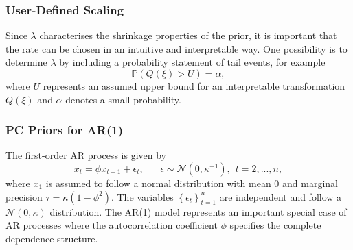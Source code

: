 \documentclass[12pt]{book}
\begin{document}
\subsubsection*{User-Defined Scaling}
Since $\lambda$ characterises the shrinkage properties of the prior, it is important that the rate can be chosen in an intuitive and interpretable way. One possibility is to determine $\lambda$ by including a probability statement of tail events, for example
\begin{equation}
    \mathbb{P}\left(Q\left(\xi\right) > U\right)=\alpha,
\end{equation}
where $U$ represents an assumed upper bound for an interpretable transformation $Q\left(\xi\right)$ and $\alpha$ denotes a small probability.
\subsubsection{PC Priors for AR(1)}
The first-order AR process is given by
\begin{equation}
    x_t=\phi x_{t-1}+\epsilon_t, \hspace{20pt}\epsilon\sim\mathcal{N}\left(0, \kappa^{-1}\right), \hspace{5pt} t=2,...,n,
\end{equation}
where $x_1$ is assumed to follow a normal distribution with mean $0$ and marginal precision $\tau=\kappa\left(1-\phi^2\right)$. The variables $\left\lbrace\epsilon_t\right\rbrace_{t=1}^n$ are independent and follow a $\mathcal{N}\left(0, \kappa\right)$ distribution. The AR(1) model represents an important special case of AR processes where the autocorrelation coefficient $\phi$ specifies the complete dependence structure.
\end{document}
